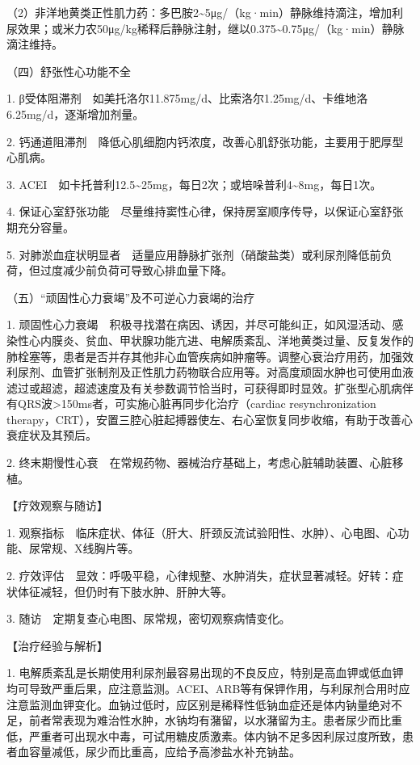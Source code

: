（2）非洋地黄类正性肌力药：多巴胺2\textasciitilde{}5μg/（kg·min）静脉维持滴注，增加利尿效果；或米力农50μg/kg稀释后静脉注射，继以0.375\textasciitilde{}0.75μg/（kg·min）静脉滴注维持。

{（四）舒张性心功能不全}

1.
β受体阻滞剂　如美托洛尔11.875mg/d、比索洛尔1.25mg/d、卡维地洛6.25mg/d，逐渐增加剂量。

2.
钙通道阻滞剂　降低心肌细胞内钙浓度，改善心肌舒张功能，主要用于肥厚型心肌病。

3.
ACEI　如卡托普利12.5\textasciitilde{}25mg，每日2次；或培哚普利4\textasciitilde{}8mg，每日1次。

4.
保证心室舒张功能　尽量维持窦性心律，保持房室顺序传导，以保证心室舒张期充分容量。

5.
对肺淤血症状明显者　适量应用静脉扩张剂（硝酸盐类）或利尿剂降低前负荷，但过度减少前负荷可导致心排血量下降。

{（五）“顽固性心力衰竭”及不可逆心力衰竭的治疗}

1.
顽固性心力衰竭　积极寻找潜在病因、诱因，并尽可能纠正，如风湿活动、感染性心内膜炎、贫血、甲状腺功能亢进、电解质紊乱、洋地黄类过量、反复发作的肺栓塞等，患者是否并存其他非心血管疾病如肿瘤等。调整心衰治疗用药，加强效利尿剂、血管扩张制剂及正性肌力药物联合应用等。对高度顽固水肿也可使用血液滤过或超滤，超滤速度及有关参数调节恰当时，可获得即时显效。扩张型心肌病伴有QRS波\textgreater{}150ms者，可实施心脏再同步化治疗（cardiac
resynchronization
therapy，CRT），安置三腔心脏起搏器使左、右心室恢复同步收缩，有助于改善心衰症状及其预后。

2.
终末期慢性心衰　在常规药物、器械治疗基础上，考虑心脏辅助装置、心脏移植。

【疗效观察与随访】

1.
观察指标　临床症状、体征（肝大、肝颈反流试验阳性、水肿）、心电图、心功能、尿常规、X线胸片等。

2.
疗效评估　显效：呼吸平稳，心律规整、水肿消失，症状显著减轻。好转：症状体征减轻，但仍时有下肢水肿、肝肿大等。

3. 随访　定期复查心电图、尿常规，密切观察病情变化。

【治疗经验与解析】

1.
电解质紊乱是长期使用利尿剂最容易出现的不良反应，特别是高血钾或低血钾均可导致严重后果，应注意监测。ACEI、ARB等有保钾作用，与利尿剂合用时应注意监测血钾变化。血钠过低时，应区别是稀释性低钠血症还是体内钠量绝对不足，前者常表现为难治性水肿，水钠均有潴留，以水潴留为主。患者尿少而比重低，严重者可出现水中毒，可试用糖皮质激素。体内钠不足多因利尿过度所致，患者血容量减低，尿少而比重高，应给予高渗盐水补充钠盐。

